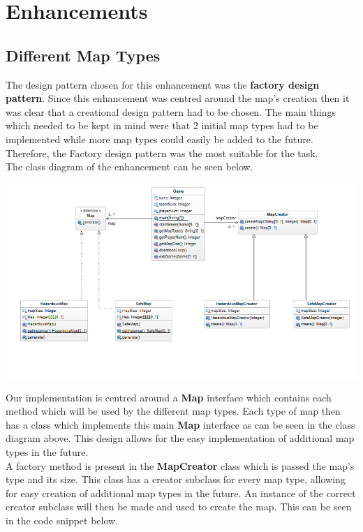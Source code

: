 \documentclass[a4paper,12pt]{extarticle}
\begin{document}
\newpage
\section{Enhancements}
\subsection{Different Map Types}

The design pattern chosen for this enhancement was the \textbf{factory design pattern}. Since this enhancement was centred around the map's creation then it was clear that a creational design pattern had to be chosen. The main things which needed to be kept in mind were that 2 initial map types had to be implemented while more map types could easily be added to the future. Therefore, the Factory design pattern was the most suitable for the task.\\

The class diagram of the enhancement can be seen below.\\

\begin{center}
\includegraphics[width=\textwidth]{Enhancement1CD.png}\\
\end{center}

\newpage

\noindent Our implementation is centred around a \textbf{Map} interface which contains each method which will be used by the different map types. Each type of map then has a class which implements this main \textbf{Map} interface as can be seen in the class diagram above. This design allows for the easy implementation of additional map types in the future.\\

\noindent A factory method is present in the \textbf{MapCreator} class which is passed the map's type and its size. This class has a creator subclass for every map type, allowing for easy creation of additional map types in the future. An instance of the correct creator subclass will then be made and used to create the map. This can be seen in the code snippet below.
\end{document}
